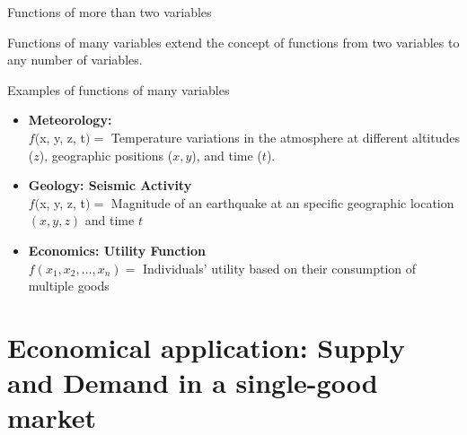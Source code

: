 \documentclass[9pt]{beamer}
\begin{document}
\begin{frame}{Functions of more than two variables}

    Functions of many variables extend the concept of functions from two variables to any number of variables. 
    
    \begin{block}{Examples of functions of many variables}
        \begin{itemize}[leftmargin = 0.5cm, label = $\bullet$, rightmargin = 0.2cm]
            \item \textbf{Meteorology:} \\ $f($x, y, z, t$) =$ Temperature variations in the atmosphere at different altitudes ($z$), geographic positions ($x, y$), and time ($t$).
            \item \textbf{Geology: Seismic Activity} \\ $f($x, y, z, t$) =$ Magnitude of an earthquake at an specific geographic location $(x, y, z)$ and time $t$
            \item \textbf{Economics: Utility Function} \\
            $f(x_1, x_2, \dots, x_n) =$ Individuals' utility based on their consumption of multiple goods %
        \end{itemize}   
    \end{block}
      
\end{frame}

\section{Economical application: 
         Supply and Demand in a single-good market}
\end{document}
